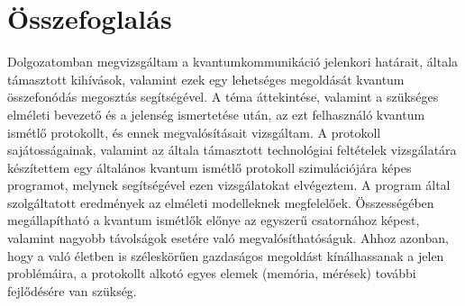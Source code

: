 \chapter{Összefoglalás}

Dolgozatomban megvizsgáltam a kvantumkommunikáció jelenkori határait, általa támasztott kihívások, valamint ezek egy lehetséges megoldását kvantum összefonódás megosztás segítségével. A téma áttekintése, valamint a szükséges elméleti bevezető és a jelenség ismertetése után, az ezt felhasználó kvantum ismétlő protokollt, és ennek megvalósításait vizsgáltam. A protokoll sajátosságainak, valamint az általa támasztott technológiai feltételek vizsgálatára készítettem egy általános kvantum ismétlő protokoll szimulációjára képes programot, melynek segítségével ezen vizsgálatokat elvégeztem. A program által szolgáltatott eredmények az elméleti modelleknek megfelelőek. Összességében megállapítható a kvantum ismétlők előnye az egyszerű csatornához képest, valamint nagyobb távolságok esetére való megvalósíthatóságuk. Ahhoz azonban, hogy a való életben is széleskörűen gazdaságos megoldást kínálhassanak a jelen problémáira, a protokollt alkotó egyes elemek (memória, mérések) további fejlődésére van szükség.
